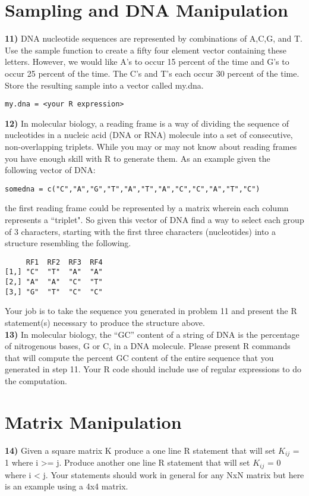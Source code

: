 \documentclass{article}
\begin{document}
\section*{Sampling and DNA Manipulation}
{\bf 11)} DNA nucleotide sequences are represented by combinations of A,C,G, and T. Use the sample function to create a fifty four element vector containing these letters. However, we would like A's to occur 15 percent of the time and G's to occur 25 percent of the time. The C's and T's each occur 30 percent of the time. Store the resulting sample into a vector called my.dna. 

\begin{verbatim}
my.dna = <your R expression>
\end{verbatim}

\noindent
{\bf 12)} In molecular biology, a reading frame is a way of dividing the sequence of nucleotides in a nucleic acid (DNA or RNA) molecule into a set of consecutive, non-overlapping triplets. While you may or may not know about reading frames you have enough skill with R to generate them. As an example given the following vector of DNA:
\begin{verbatim}
somedna = c("C","A","G","T","A","T","A","C","C","A","T","C")
\end{verbatim}
the first reading frame could be represented by a matrix wherein each column represents a ``triplet". So given this vector of DNA find a way to select each group of 3 characters, starting with the first three characters (nucleotides) into a structure resembling the following.

\begin{verbatim}
     RF1  RF2  RF3  RF4
[1,] "C"  "T"  "A"  "A" 
[2,] "A"  "A"  "C"  "T" 
[3,] "G"  "T"  "C"  "C"
\end{verbatim}
Your job is to take the sequence you generated in problem 11 and present the R statement(s) necessary to produce the structure above.
\\

\noindent
{\bf 13)} In molecular biology, the ``GC'' content of a string of DNA is the percentage of nitrogenous bases, G or C, in a DNA molecule. Please present R commands that will
compute the percent GC content of the entire sequence that you generated in step 11. Your R code should include use of regular expressions to do the computation.
\\

\section*{Matrix Manipulation}
\noindent 
{\bf 14)} Given a square matrix K produce a one line R statement
that will set $K_{ij}$ = 1 where i >= j. Produce another one line R statement that will set $K_{ij}$ = 0 where i < j. Your statements should work in general for any NxN matrix but here is an example using a 4x4 matrix.
\end{document}
